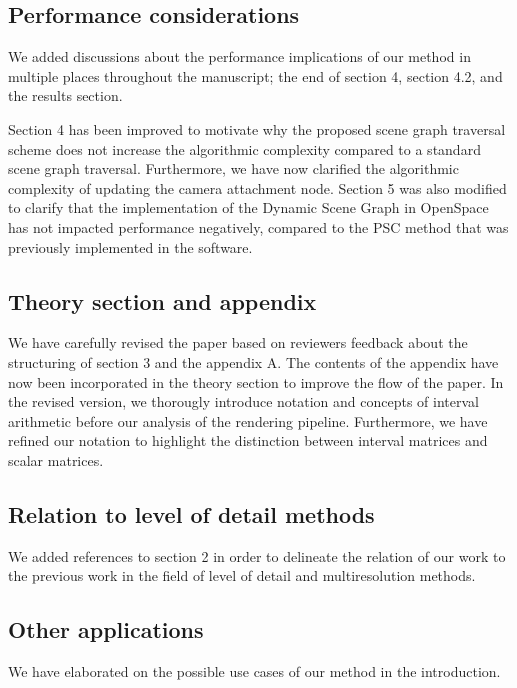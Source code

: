 \documentclass{article}
\begin{document}


\subsection{Performance considerations}\label{concern:performance}
We added discussions about the performance implications of our method in multiple places
throughout the manuscript;  the end of section 4, section 4.2, and the results section.

Section 4 has been improved to motivate why the proposed scene graph traversal scheme does not increase the algorithmic complexity compared to a standard scene graph traversal.
Furthermore, we have now clarified the algorithmic complexity of updating the camera attachment node.
Section 5 was also modified to clarify that the implementation of the Dynamic Scene Graph in OpenSpace has not impacted performance negatively, compared to the PSC method that was previously implemented in the software.

\subsection{Theory section and appendix}\label{concern:structure}
We have carefully revised the paper based on reviewers feedback about the structuring of section 3 and the appendix A.
The contents of the appendix have now been incorporated in the theory section to improve the flow of the paper. In the revised version, we thorougly introduce notation and concepts of interval arithmetic before our analysis of the rendering pipeline. Furthermore, we have refined our notation to highlight the distinction between interval matrices and scalar matrices.

\subsection{Relation to level of detail methods}\label{concern:lod}
We added references to section 2 in order to delineate the relation of our work to the previous work in the field of level of detail and multiresolution methods.

\subsection{Other applications}\label{concern:applications}
We have elaborated on the possible use cases of our method in the introduction. 
\end{document}
